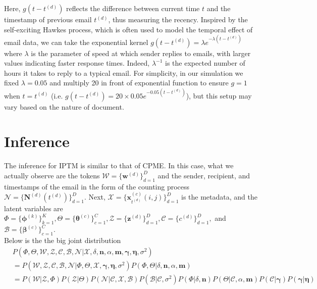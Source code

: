 \documentclass[a4paper]{article}
\begin{document}
Here, $g(t-t^{(d)})$ reflects the difference between current time $t$ and the timestamp of previous email $t^{(d)}$, thus measuring the recency. Inspired by the self-exciting Hawkes process, which is often used to model the temporal effect of email data, we can take the exponential kernel $g(t-t^{(d)})=\lambda e^{-\lambda(t-t^{(d)})}$ where $\lambda$ is the parameter of speed at
which sender replies to emails, with larger values indicating faster response times. Indeed, $\lambda^{-1}$ is the expected number of hours it takes to reply to a typical email. For simplicity, in our simulation we fixed $\lambda=0.05$ and multiply 20 in front of exponential function to ensure $g=1$ when $t=t^{(d)}$ (i.e. $g(t-t^{(d)})=20\times 0.05e^{-0.05(t-t^{(d)})}$), but this setup may vary based on the nature of document.
\section{Inference}
The inference for IPTM is similar to that of CPME. In this case, what we actually observe are the tokens $\mathcal{W}=\{\boldsymbol{w}^{(d)} \}_{d=1}^{D}$ and the sender, recipient, and timestamps of the email in the form of the counting process $\mathcal{N}=\{\boldsymbol{N}^{(d)}(t^{(d)}) \}_{d=1}^{D}.$ Next,  $\mathcal{X}=\{\boldsymbol{x}^{(c)}_{t^{(d)}}(i, j)\}_{d=1}^{D}$ is the metadata, and the latent variables are $\Phi=\{\boldsymbol{\phi}^{(k)}\}_{k=1}^{K}, \Theta=\{\boldsymbol{\theta}^{(c)} \}_{c=1}^{C}, \mathcal{Z}=\{\boldsymbol{z}^{(d)} \}_{d=1}^{D}, \mathcal{C}=\{{c}^{(d)} \}_{d=1}^{D},$ and $\mathcal{B}=\{\boldsymbol{\beta}^{(c)} \}_{c=1}^{C}$.\\
\newline 
Below is the the big joint distribution
\begin{equation}
\begin{aligned}
& P(\Phi, \Theta, \mathcal{W}, \mathcal{Z}, \mathcal{C}, \mathcal{B}, \mathcal{N}| \mathcal{X}, \delta, \boldsymbol{n}, \alpha, \boldsymbol{m}, \boldsymbol{\gamma}, \boldsymbol{\eta}, \sigma^2) \\& 
=  P(\mathcal{W}, \mathcal{Z}, \mathcal{C}, \mathcal{B}, \mathcal{N}| \Phi, \Theta, \mathcal{X}, \boldsymbol{\gamma}, \boldsymbol{\eta}, \sigma^2) P(\Phi, \Theta |\delta, \boldsymbol{n}, \alpha, \boldsymbol{m})
\\&= P( \mathcal{W}| \mathcal{Z}, \Phi)P(\mathcal{Z}|\Theta)P(\mathcal{N}|\mathcal{C}, \mathcal{X}, \mathcal{B})P(\mathcal{B}|\mathcal{C}, \sigma^2)P(\Phi|\delta, \boldsymbol{n})P(\Theta|\mathcal{C}, \alpha, \boldsymbol{m})P(\mathcal{C}|\boldsymbol{\gamma})P(\boldsymbol{\gamma}|\boldsymbol{\eta})
\end{aligned}
\end{equation}
\end{document}
